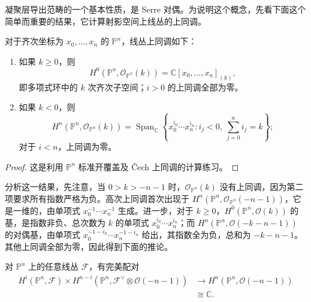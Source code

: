 凝聚层导出范畴的一个基本性质，是 Serre 对偶。为说明这个概念，先看下面这个简单而重要的结果，它计算射影空间上线丛的上同调。

\begin{theorem}\label{thm:4.66}
对于齐次坐标为 $x_0,\ldots,x_n$ 的 $\mathbb{P}^n$，线丛上同调如下：
\begin{enumerate}[label=(\arabic*)]
\item 如果 $k\ge0$，则
\[
H^0(\mathbb{P}^n,\mathcal{O}_{\mathbb{P}^n}(k))
=\mathbb{C}[x_0,\ldots,x_n]_{(k)},
\]
即多项式环中的 $k$ 次齐次子空间；$i>0$ 的上同调全部为零。
\item 如果 $k<0$，则
\[
H^n(\mathbb{P}^n,\mathcal{O}_{\mathbb{P}^n}(k))
=\operatorname{Span}_{\mathbb{C}}
\left\{x_0^{i_0}\cdots x_n^{i_n}:i_j<0,\ \sum_{j=0}^ni_j=k\right\};
\]
对于 $i<n$，上同调为零。
\end{enumerate}
\end{theorem}
\begin{proof}
这是利用 $\mathbb{P}^n$ 标准开覆盖及 \v Cech 上同调的计算练习。\BookQED
\end{proof}

分析这一结果，先注意，当 $0>k>-n-1$ 时，$\mathcal{O}_{\mathbb{P}^n}(k)$ 没有上同调，因为第二项要求所有指数严格为负。高次上同调首次出现于 $H^n(\mathbb{P}^n,\mathcal{O}_{\mathbb{P}^n}(-n-1))$，它是一维的，由单项式 $x_0^{-1}\cdots x_n^{-1}$ 生成。进一步，对于 $k\ge0$，$H^0(\mathbb{P}^n,\mathcal{O}(k))$ 的基，是指数非负、总次数为 $k$ 的单项式 $x_0^{i_0}\cdots x_n^{i_n}$；而 $H^n(\mathbb{P}^n,\mathcal{O}(-k-n-1))$ 的对偶基，由单项式 $x_0^{-1-i_0}\cdots x_n^{-1-i_n}$ 给出，其指数全为负，总和为 $-k-n-1$。其他上同调全部为零，因此得到下面的推论。

\begin{corollary}\label{cor:4.67}
对 $\mathbb{P}^n$ 上的任意线丛 $\mathcal{F}$，有完美配对
\[
\begin{aligned}
H^i(\mathbb{P}^n,\mathcal{F})\times
H^{n-i}(\mathbb{P}^n,\mathcal{F}^{\vee}\otimes\mathcal{O}(-n-1))
&\longrightarrow H^n(\mathbb{P}^n,\mathcal{O}(-n-1))\\
&\cong\mathbb{C}.
\end{aligned}
\]
\end{corollary}

